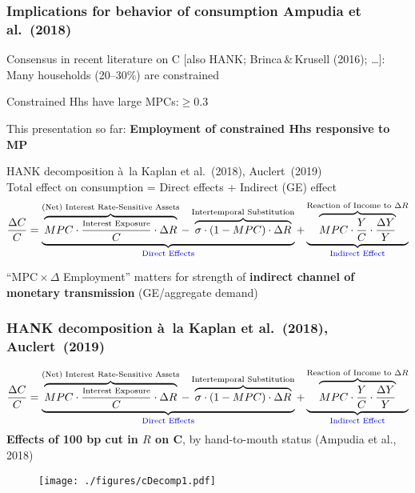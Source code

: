 \documentclass[pdflatex,aspectratio=169]{beamer}
\newcommand{\jemph}[1]{{\color{StataDarkBlue}#1}}
\newcommand{\jbemph}[1]{\textbf{\color{SlideNavy}#1}}
\begin{document}
\begin{frame}\frametitle{\bf Implications for behavior of consumption \hspace*{\fill} \footnotesize{Ampudia et al.\ (2018)} }


\bi\setlength{\itemsep}{2mm}
\item {Consensus in recent literature on C $[$also HANK; Brinca$\,\&\,$Krusell (2016); \dots$]$:}\\
Many households (20--30\%) are \jemph{constrained}
\pause
\item Constrained Hhs have \jemph{large MPCs:${}\ge0.3$}
\pause
\item This presentation so far: \jbemph{Employment of constrained Hhs responsive to MP}
\pause
\item  HANK decomposition \`a\ la Kaplan et al.~(2018), Auclert~(2019)\\
Total effect on consumption = Direct effects + Indirect (GE) effect
{\small
$$
\frac{\Delta C}{C}=\underbrace{\overbrace{MPC\cdot\frac{\text{\scriptsize{Interest Exposure}}}{C}\cdot\Delta R}^{\text{(Net) Interest Rate-Sensitive Assets}}-\overbrace{\sigma\cdot(1-MPC)\cdot\Delta R}^{\text{Intertemporal Substitution}}}_{\text{\jemph{Direct Effects}}}+\underbrace{\overbrace{MPC\cdot\frac{Y}{C}\cdot\frac{\Delta Y}{Y}}^{\text{Reaction of Income to $\Delta R$}}}_{\text{\jemph{Indirect Effect}}}
$$
}
\pause
 \item \jemph{``MPC${}\times\Delta$ Employment'' matters for strength of \jbemph{indirect channel of monetary transmission} (GE/aggregate demand) }\\
\ei


\end{frame}



\begin{frame}\frametitle{\bf HANK decomposition \`a\ la Kaplan et al.~(2018), Auclert~(2019)}
\vspace*{-2.5mm}
\footnotesize
$$
\frac{\Delta C}{C}=\underbrace{\overbrace{MPC\cdot\frac{\text{\scriptsize{Interest Exposure}}}{C}\cdot\Delta R}^{\text{(Net) Interest Rate-Sensitive Assets}}-\overbrace{\sigma\cdot(1-MPC)\cdot\Delta R}^{\text{Intertemporal Substitution}}}_{\text{\jemph{Direct Effects}}}+\underbrace{\overbrace{MPC\cdot\frac{Y}{C}\cdot\frac{\Delta Y}{Y}}^{\text{Reaction of Income to $\Delta R$}}}_{\text{\jemph{Indirect Effect}}}
$$
\small
\jbemph{Effects of 100 bp cut in $R$ on C}, by hand-to-mouth status (Ampudia et al., 2018)
\begin{figure}
\begin{center}
\texttt{[image: ./figures/cDecomp1.pdf]}
\end{center}
\end{figure}
\end{frame}
\end{document}

